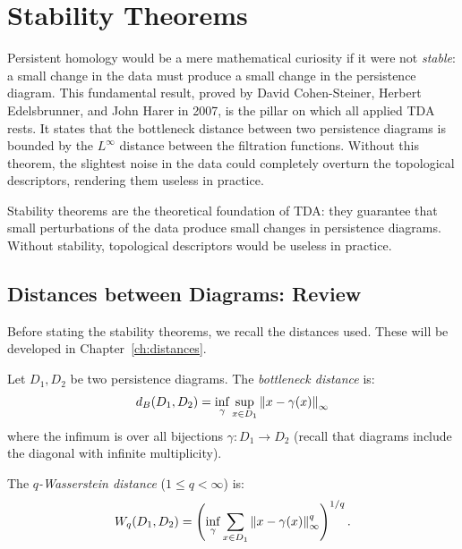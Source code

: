 \chapter{Stability Theorems}
\label{ch:stability}

Persistent homology would be a mere mathematical curiosity if it were not \emph{stable}: a small change in the data must produce a small change in the persistence diagram. This fundamental result, proved by David Cohen-Steiner, Herbert Edelsbrunner, and John Harer in 2007, is the pillar on which all applied TDA rests. It states that the bottleneck distance between two persistence diagrams is bounded by the $L^\infty$ distance between the filtration functions. Without this theorem, the slightest noise in the data could completely overturn the topological descriptors, rendering them useless in practice.

\begin{intuition}
Stability theorems are the theoretical foundation of TDA: they guarantee
that small perturbations of the data produce small changes in
persistence diagrams. Without stability, topological descriptors would
be useless in practice.
\end{intuition}

\section{Distances between Diagrams: Review}

Before stating the stability theorems, we recall the distances used.
These will be developed in Chapter~\ref{ch:distances}.

\begin{definition}
Let $D_1, D_2$ be two persistence diagrams. The \emph{bottleneck
distance} is:
\[
  d_B(D_1, D_2) = \inf_{\gamma} \sup_{x \in D_1}
  \left\| x - \gamma(x) \right\|_\infty
\]
where the infimum is over all bijections $\gamma : D_1 \to D_2$
(recall that diagrams include the diagonal with infinite multiplicity).
\end{definition}

\begin{definition}
The \emph{$q$-Wasserstein distance} ($1 \leq q < \infty$) is:
\[
  W_q(D_1, D_2) = \left(\inf_{\gamma} \sum_{x \in D_1}
  \left\| x - \gamma(x) \right\|_\infty^q \right)^{1/q}.
\]
\end{definition}

